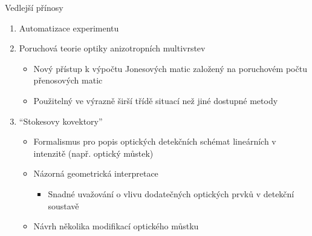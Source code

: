 \begin{frame}{Vedlejší přínosy}
    \begin{enumerate}
        \item Automatizace experimentu
            \pause
        \item Poruchová teorie optiky anizotropních multivrstev 
            \begin{itemize}
                \item Nový přístup k výpočtu Jonesových matic založený na poruchovém počtu přenosových matic
                    \pause
                \item Použitelný ve výrazně širší třídě situací než jiné dostupné metody
            \end{itemize}
            \pause
        \item ``Stokesovy kovektory''
            \begin{itemize}
                \item Formalismus pro popis optických detekčních schémat lineárních v intenzitě (např. optický můstek)
                    \pause
                \item Názorná geometrická interpretace
                    \begin{itemize}
                        \item Snadné uvažování o vlivu dodatečných optických prvků v detekční soustavě
                    \end{itemize}
                    \pause
                \item Návrh několika modifikací optického můstku
                    \end{itemize}
    \end{enumerate}
\end{frame}
